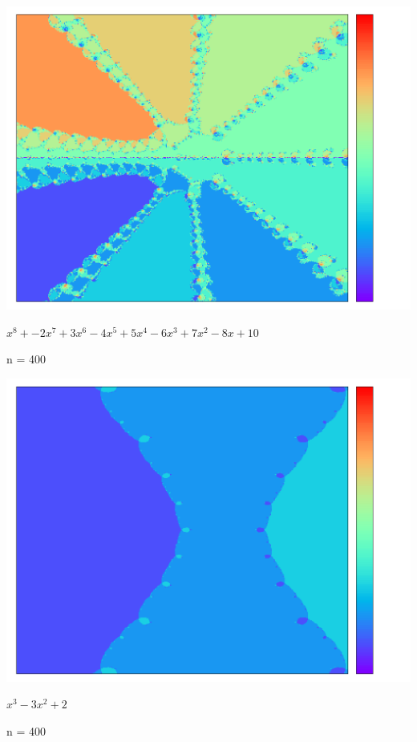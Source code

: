 \documentclass{article}
\begin{document}
\begin{center}
\includegraphics[scale=.4]{1_-2_3_-4_5_-6_7_-8_10_400.png}

\emph{$x^{8} + -2x^{7} + 3x^{6} - 4 x^{5} + 5x^{4} - 6x^{3} + 7x^{2} - 8x + 10$}

n = 400

\bigskip

\includegraphics[scale=.4]{1_-3_0_2_400.png}

\emph{$x^{3} -3x^{2} + 2$}

n = 400

\bigskip


\end{center}
\end{document}
